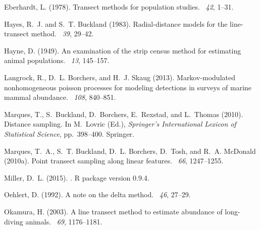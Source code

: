 \documentclass[useAMS,usenatbib,referee]{biom}
\begin{document}
\begin{thebibliography}{}
Eberhardt, L. (1978).
\newblock Transect methods for population studies.
~{\em 42}, 1--31.

Hayes, R.~J. and S.~T. Buckland (1983).
\newblock Radial-distance models for the line-transect method.
~{\em 39}, 29--42.

Hayne, D. (1949).
\newblock An examination of the strip census method for estimating animal
  populations.
~{\em 13}, 145--157.

Langrock, R., D.~L. Borchers, and H.~J. Skaug (2013).
\newblock Markov-modulated nonhomogeneous poisson processes for modeling
  detections in surveys of marine mammal abundance.
~{\em 108},
  840--851.

Marques, T., S.~Buckland, D.~Borchers, E.~Rexstad, and L.~Thomas (2010).
\newblock Distance sampling.
\newblock In M.~Lovric (Ed.), {\em Springer's International Lexicon of
  Statistical Science}, pp.\  398--400. Springer.

Marques, T.~A., S.~T. Buckland, D.~L. Borchers, D.~Tosh, and R.~A. McDonald
  (2010a).
\newblock Point transect sampling along linear features.
~{\em 66\/}, 1247--1255.

Miller, D.~L. (2015).
.
\newblock R package version 0.9.4.

Oehlert, D. (1992).
\newblock A note on the delta method.
~{\em 46\/}, 27--29.

Okamura, H. (2003).
\newblock A line transect method to estimate abundance of long-diving animals.
~{\em 69}, 1176--1181.


\end{thebibliography}
\end{document}
